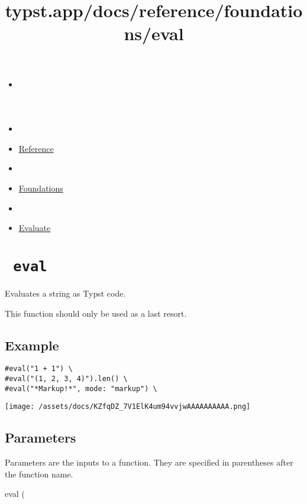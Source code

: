 \title{typst.app/docs/reference/foundations/eval}

\begin{itemize}
\tightlist
\item
  \href{/docs}{}
\item
  
\item
  \href{/docs/reference/}{Reference}
\item
  
\item
  \href{/docs/reference/foundations/}{Foundations}
\item
  
\item
  \href{/docs/reference/foundations/eval/}{Evaluate}
\end{itemize}

\section{\texorpdfstring{\texttt{\ eval\ }}{ eval }}\label{summary}

Evaluates a string as Typst code.

This function should only be used as a last resort.

\subsection{Example}\label{example}

\begin{verbatim}
#eval("1 + 1") \
#eval("(1, 2, 3, 4)").len() \
#eval("*Markup!*", mode: "markup") \
\end{verbatim}

\texttt{[image: /assets/docs/KZfqDZ\_7V1ElK4um94vvjwAAAAAAAAAA.png]}

\subsection{\texorpdfstring{{ Parameters
}}{ Parameters }}\label{parameters}

\phantomsection\label{parameters-tooltip}
Parameters are the inputs to a function. They are specified in
parentheses after the function name.

{ eval } (

